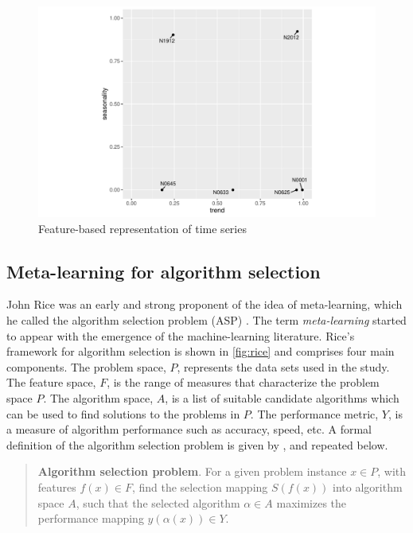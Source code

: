 \documentclass[11pt,a4paper,]{article}
\begin{document}
\begin{figure}

{\centering \includegraphics[width=0.7\linewidth]{figure/fig2-1} 

}

\caption{Feature-based representation of time series}\label{fig:fig2}
\end{figure}

\hypertarget{meta-learning-for-algorithm-selection}{%
\subsection{Meta-learning for algorithm selection}\label{meta-learning-for-algorithm-selection}}

John Rice was an early and strong proponent of the idea of meta-learning, which he called the algorithm selection problem (ASP) \autocite{rice1976}. The term \emph{meta-learning} started to appear with the emergence of the machine-learning literature. Rice's framework for algorithm selection is shown in \autoref{fig:rice} and comprises four main components. The problem space, \(P\), represents the data sets used in the study. The feature space, \(F\), is the range of measures that characterize the problem space \(P\). The algorithm space, \(A\), is a list of suitable candidate algorithms which can be used to find solutions to the problems in \(P\). The performance metric, \(Y\), is a measure of algorithm performance such as accuracy, speed, etc. A formal definition of the algorithm selection problem is given by \textcite{smith2009cross}, and repeated below.

\begin{quote}
\textbf{Algorithm selection problem}. For a given problem instance \(x \in P\), with features \(f(x) \in F\), find the selection mapping \(S(f(x))\) into algorithm space \(A\), such that the selected algorithm \(\alpha \in A\) maximizes the performance mapping \(y(\alpha(x)) \in Y\).
\end{quote}
\end{document}
